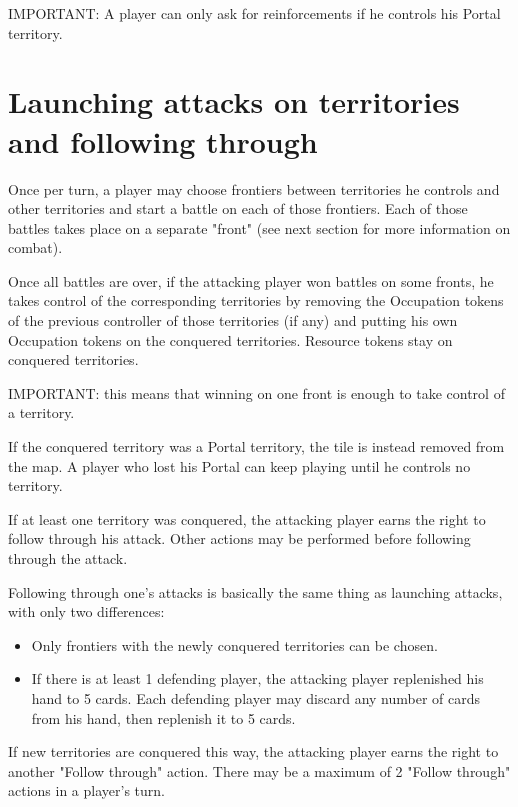 \documentclass[a4paper]{article}
\begin{document}
    IMPORTANT: A player can only ask for reinforcements if he controls his Portal territory. 



\section{Launching attacks on territories and following through}

    Once per turn, a player may choose frontiers between territories he controls and other territories and
    start a battle on each of those frontiers.
    Each of those battles takes place on a separate "front" (see next section for more information on combat).

    Once all battles are over, if the attacking player won battles on some fronts, he takes control of
    the corresponding territories by removing the Occupation tokens of the previous controller of those territories (if any)
    and putting his own Occupation tokens on the conquered territories.
    Resource tokens stay on conquered territories.
    
    IMPORTANT: this means that winning on one front is enough to take control of a territory.

    If the conquered territory was a Portal territory, the tile is instead removed from the map.
    A player who lost his Portal can keep playing until he controls no territory.

    If at least one territory was conquered, the attacking player earns the right to follow through his attack.
    Other actions may be performed before following through the attack.

    Following through one's attacks is basically the same thing as launching attacks, with only two differences:

    \begin{itemize}
        \item Only frontiers with the newly conquered territories can be chosen.
        \item If there is at least 1 defending player, the attacking player replenished his hand to 5 cards. Each defending player may discard any number of cards from his hand, then replenish it to 5 cards.
    \end{itemize}

    If new territories are conquered this way, the attacking player earns the right to another "Follow through" action. There may be a maximum of 2 "Follow through" actions in a player's turn.
\end{document}
